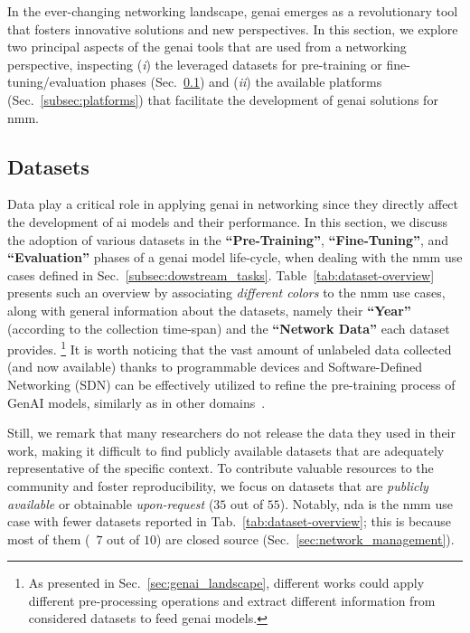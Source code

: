 
In the ever-changing networking landscape, \gls{genai} emerges as a revolutionary tool that fosters innovative solutions and new perspectives.
In this section, we explore two principal aspects of the \gls{genai} tools that are used from a networking perspective, inspecting (\textit{i}) the leveraged datasets for pre-training or fine-tuning/evaluation phases (Sec.~\ref{subsec:datasets}) and (\textit{ii}) the available platforms (Sec.~\ref{subsec:platforms}) that facilitate the development of \gls{genai} solutions for \gls{nmm}. 


\subsection{Datasets}
\label{subsec:datasets}

Data play a critical role in applying \gls{genai} in networking since they directly affect the development of \gls{ai} models and their performance.
In this section, we discuss the adoption of various datasets in the \textbf{``Pre-Training''}, \textbf{``Fine-Tuning''}, and \textbf{``Evaluation''} phases of a \gls{genai} model life-cycle, when dealing with the \gls{nmm} use cases defined in Sec.~\ref{subsec:dowstream_tasks}. 
Table~\ref{tab:dataset-overview} presents such an overview by associating \emph{different colors} to the \gls{nmm} use cases, along with general information about the datasets, namely their \textbf{``Year''} (according to the collection time-span) and the \textbf{``Network Data''} each dataset provides.%
\footnote{As presented in Sec.~\ref{sec:genai_landscape}, different works could apply different pre-processing operations and extract different information from considered datasets to feed \gls{genai} models.}
%
It is worth noticing that the vast amount of unlabeled data collected (and now available) thanks to programmable devices and Software-Defined Networking (SDN) can be effectively utilized to refine the pre-training process of GenAI models, similarly as in other domains~\cite{zhu2022zoonet, yu2019network, d2019survey}.
%

%
Still,
%
we remark that many researchers do not release the data they used in their work, making it difficult to find publicly available datasets that are adequately representative of the specific context.
To contribute valuable resources to the community and foster reproducibility, we focus on datasets that are \textit{publicly available} or obtainable\textit{ upon-request} ($35$ out of $55$).
Notably, \gls{nda} is the \gls{nmm} use case with fewer datasets reported in Tab.~\ref{tab:dataset-overview}; 
this is because most of them (\ie~$7$ out of $10$) are closed source (\cf Sec.~\ref{sec:network_management}).

